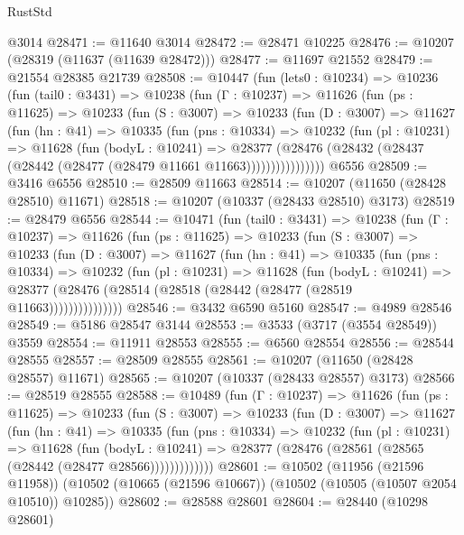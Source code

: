 \begin{lexlean}{RustStd}
\begin{coremodule}
    @3014
@28471 := @11640 @3014
@28472 := @28471 @10225
@28476 := @10207 (@28319 (@11637 (@11639 @28472)))
@28477 := @11697 @21552
@28479 := @21554 @28385 @21739
@28508 := @10447
    (fun (lets0 : @10234) =>
    @10236
      (fun (tail0 : @3431) =>
      @10238
        (fun (Γ : @10237) =>
        @11626
          (fun (ps : @11625) =>
          @10233
            (fun (S : @3007) =>
            @10233
              (fun (D : @3007) =>
              @11627
                (fun (hn : @41) =>
                @10335
                  (fun (pns : @10334) =>
                  @10232
                    (fun (pl : @10231) =>
                    @11628
                      (fun (bodyL : @10241) =>
                      @28377
                        (@28476
                          (@28432 (@28437 (@28442 (@28477 (@28479 @11661 @11663))))))))))))))))
    @6556
@28509 := @3416 @6556
@28510 := @28509 @11663
@28514 := @10207 (@11650 (@28428 @28510) @11671)
@28518 := @10207 (@10337 (@28433 @28510) @3173)
@28519 := @28479 @6556
@28544 := @10471
    (fun (tail0 : @3431) =>
    @10238
      (fun (Γ : @10237) =>
      @11626
        (fun (ps : @11625) =>
        @10233
          (fun (S : @3007) =>
          @10233
            (fun (D : @3007) =>
            @11627
              (fun (hn : @41) =>
              @10335
                (fun (pns : @10334) =>
                @10232
                  (fun (pl : @10231) =>
                  @11628
                    (fun (bodyL : @10241) =>
                    @28377 (@28476 (@28514 (@28518 (@28442 (@28477 (@28519 @11663)))))))))))))))
@28546 := @3432 @6590 @5160
@28547 := @4989 @28546
@28549 := @5186 @28547 @3144
@28553 := @3533 (@3717 (@3554 @28549)) @3559
@28554 := @11911 @28553
@28555 := @6560 @28554
@28556 := @28544 @28555
@28557 := @28509 @28555
@28561 := @10207 (@11650 (@28428 @28557) @11671)
@28565 := @10207 (@10337 (@28433 @28557) @3173)
@28566 := @28519 @28555
@28588 := @10489
    (fun (Γ : @10237) =>
    @11626
      (fun (ps : @11625) =>
      @10233
        (fun (S : @3007) =>
        @10233
          (fun (D : @3007) =>
          @11627
            (fun (hn : @41) =>
            @10335
              (fun (pns : @10334) =>
              @10232
                (fun (pl : @10231) =>
                @11628
                  (fun (bodyL : @10241) =>
                  @28377 (@28476 (@28561 (@28565 (@28442 (@28477 @28566)))))))))))))
@28601 := @10502
    (@11956 (@21596 @11958))
    (@10502 (@10665 (@21596 @10667)) (@10502 (@10505 (@10507 @2054 @10510)) @10285))
@28602 := @28588 @28601
@28604 := @28440 (@10298 @28601)

\end{coremodule}
\end{lexlean}
